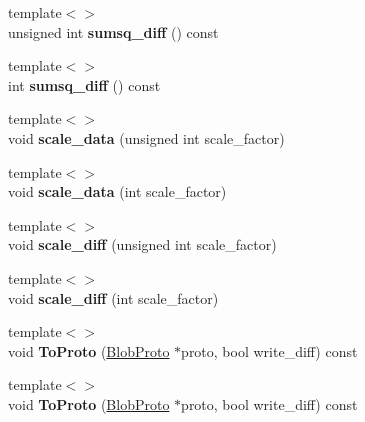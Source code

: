 \begin{DoxyCompactItemize}
\item 
\mbox{\label{classcaffe_1_1_blob_a71f00f3e867e4ebccd30fb261f5109a2}} 
{\footnotesize template$<$$>$ }\\unsigned int {\bfseries sumsq\+\_\+diff} () const
\item 
\mbox{\label{classcaffe_1_1_blob_a4edc021fb188ee25d0113a167858c5ec}} 
{\footnotesize template$<$$>$ }\\int {\bfseries sumsq\+\_\+diff} () const
\item 
\mbox{\label{classcaffe_1_1_blob_af90e5b5950b5002ae75243e988a5cfe2}} 
{\footnotesize template$<$$>$ }\\void {\bfseries scale\+\_\+data} (unsigned int scale\+\_\+factor)
\item 
\mbox{\label{classcaffe_1_1_blob_a99de38dc8933f2f6d410eb9cd05aeaa0}} 
{\footnotesize template$<$$>$ }\\void {\bfseries scale\+\_\+data} (int scale\+\_\+factor)
\item 
\mbox{\label{classcaffe_1_1_blob_aaf182851c1d42c79928e9fc2fd6a652e}} 
{\footnotesize template$<$$>$ }\\void {\bfseries scale\+\_\+diff} (unsigned int scale\+\_\+factor)
\item 
\mbox{\label{classcaffe_1_1_blob_a8eab6dc0ff159e72845774db6f032918}} 
{\footnotesize template$<$$>$ }\\void {\bfseries scale\+\_\+diff} (int scale\+\_\+factor)
\item 
\mbox{\label{classcaffe_1_1_blob_af20401e9b2ad7c89aa7c77711f653b7a}} 
{\footnotesize template$<$$>$ }\\void {\bfseries To\+Proto} (\mbox{\hyperlink{classcaffe_1_1_blob_proto}{Blob\+Proto}} $\ast$proto, bool write\+\_\+diff) const
\item 
\mbox{\label{classcaffe_1_1_blob_ae21cbe8230094762001913bdaee472a7}} 
{\footnotesize template$<$$>$ }\\void {\bfseries To\+Proto} (\mbox{\hyperlink{classcaffe_1_1_blob_proto}{Blob\+Proto}} $\ast$proto, bool write\+\_\+diff) const
\end{DoxyCompactItemize}
